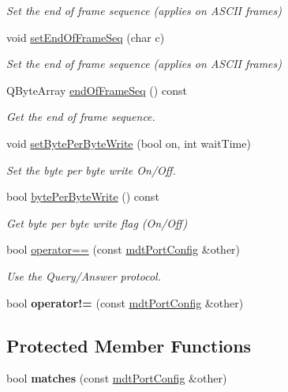 \begin{DoxyCompactItemize}
\begin{DoxyCompactList}\small\item\em Set the end of frame sequence (applies on ASCII frames) \end{DoxyCompactList}\item 
void \hyperlink{classmdt_port_config_a9c67e95bb660a13313ec03e07a924793}{setEndOfFrameSeq} (char c)
\begin{DoxyCompactList}\small\item\em Set the end of frame sequence (applies on ASCII frames) \end{DoxyCompactList}\item 
QByteArray \hyperlink{classmdt_port_config_a9ac77f89ee4a0baadc4814a9a95701b6}{endOfFrameSeq} () const 
\begin{DoxyCompactList}\small\item\em Get the end of frame sequence. \end{DoxyCompactList}\item 
void \hyperlink{classmdt_port_config_ac6cb3d8fbefad9a832335c3f2023832c}{setBytePerByteWrite} (bool on, int waitTime)
\begin{DoxyCompactList}\small\item\em Set the byte per byte write On/Off. \end{DoxyCompactList}\item 
bool \hyperlink{classmdt_port_config_a9b5041ba740a5918e5e1323e61d3bbdc}{bytePerByteWrite} () const 
\begin{DoxyCompactList}\small\item\em Get byte per byte write flag (On/Off) \end{DoxyCompactList}\item 
bool \hyperlink{classmdt_port_config_a639c71f90cfeb7e2160ad90e9775054b}{operator==} (const \hyperlink{classmdt_port_config}{mdtPortConfig} \&other)
\begin{DoxyCompactList}\small\item\em Use the Query/Answer protocol. \end{DoxyCompactList}\item 
\hypertarget{classmdt_port_config_a5a539c86934d41306a3ed18a8292457d}{
bool {\bfseries operator!=} (const \hyperlink{classmdt_port_config}{mdtPortConfig} \&other)}
\label{classmdt_port_config_a5a539c86934d41306a3ed18a8292457d}

\end{DoxyCompactItemize}
\subsection*{Protected Member Functions}
\begin{DoxyCompactItemize}
\item 
\hypertarget{classmdt_port_config_a6372ebc36d4476899e2274299ae5799d}{
bool {\bfseries matches} (const \hyperlink{classmdt_port_config}{mdtPortConfig} \&other)}
\label{classmdt_port_config_a6372ebc36d4476899e2274299ae5799d}

\end{DoxyCompactItemize}
